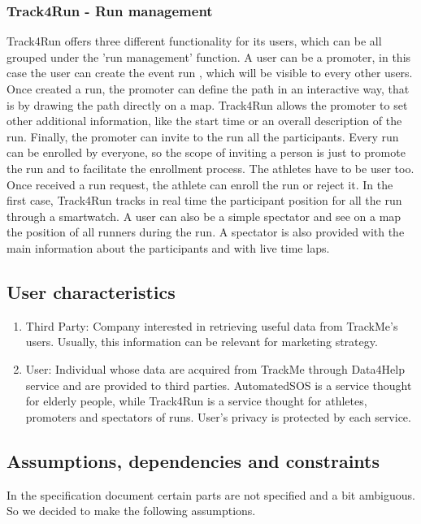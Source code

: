 \subsubsection{Track4Run - Run management}
Track4Run offers three different functionality for its users, which can be all grouped under the 'run management' function. A user can be a promoter, in this case the user can create the event run , which will be visible to every other users. Once created a run, the promoter can define the path in an interactive way, that is by drawing the path directly on a map. Track4Run allows the promoter to set other additional information, like the start time or an overall description of the run. Finally, the promoter can invite to the run all the participants. Every run can be enrolled by everyone, so the scope of inviting a person is just to promote the run and to facilitate the enrollment process.
\bigbreak
\noindent
The athletes have to be user too. Once received a run request, the athlete can enroll the run or reject it. In the first case, Track4Run tracks in real time the participant position for all the run through a smartwatch. 
\bigbreak
\noindent
A user can also be a simple spectator and see on a map the position of all runners during the run. A spectator is also provided with the main information about the participants and with live time laps.

\subsection{User characteristics}
\begin{enumerate}
\item Third Party: Company interested in retrieving useful data from TrackMe's users. Usually, this information can be relevant for marketing strategy.

\item User: Individual whose data are acquired from TrackMe through Data4Help service and are provided to third parties. AutomatedSOS is a service thought for elderly people, while Track4Run is a service thought for athletes, promoters and spectators of runs. User's privacy is protected by each service.

\end{enumerate}

\subsection{Assumptions, dependencies and constraints}
In the specification document certain parts are not specified and a bit ambiguous. So we decided to make the following assumptions.

